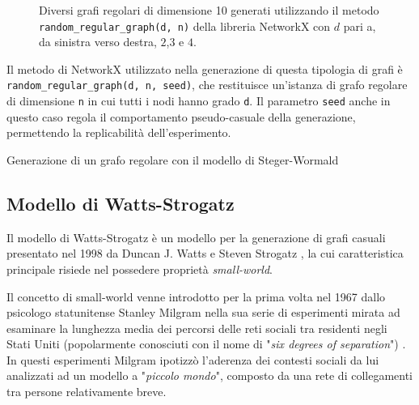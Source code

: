 \begin{figure}[h!]
\begin{subfigure}[b]{0.29\textwidth}
     \end{subfigure}
        \caption{Diversi grafi regolari di dimensione 10 generati utilizzando il metodo \texttt{random\_regular\_graph(d, n)} della libreria NetworkX con $d$ pari a, da sinistra verso destra,  $2$,$3$ e $4$.}
        \label{fig:rrges}
\end{figure}

Il metodo di NetworkX utilizzato nella generazione di questa tipologia di grafi è\\
\texttt{random\_regular\_graph(d, n, seed)}, che restituisce un'istanza di grafo regolare di dimensione \texttt{n} in cui tutti i nodi hanno grado \texttt{d}. Il parametro \texttt{seed} anche in questo caso regola il comportamento pseudo-casuale della generazione, permettendo la replicabilità dell'esperimento.

\begin{algorithm}
\SetAlgoLined
{}
 \caption{Generazione di un grafo regolare con il modello di Steger-Wormald}
 \label{alg:rrg}
\end{algorithm}


\subsection{Modello di Watts-Strogatz}
\label{subsec:watts}
Il modello di Watts-Strogatz è un modello per la generazione di grafi casuali presentato nel 1998 da Duncan J. Watts e Steven Strogatz \cite{watts_collective_1998}, la cui caratteristica principale risiede nel possedere proprietà \textit{small-world}. 

Il concetto di small-world venne introdotto per la prima volta nel 1967 dallo psicologo statunitense Stanley Milgram nella sua serie di esperimenti mirata ad esaminare la lunghezza media dei percorsi delle reti sociali tra residenti negli Stati Uniti (popolarmente conosciuti con il nome di "\textit{six degrees of separation}") \cite{milgram_small-world_1967}. In questi esperimenti Milgram ipotizzò l'aderenza dei contesti sociali da lui analizzati ad un modello a "\textit{piccolo mondo}", composto da una rete di collegamenti tra persone relativamente breve.  

